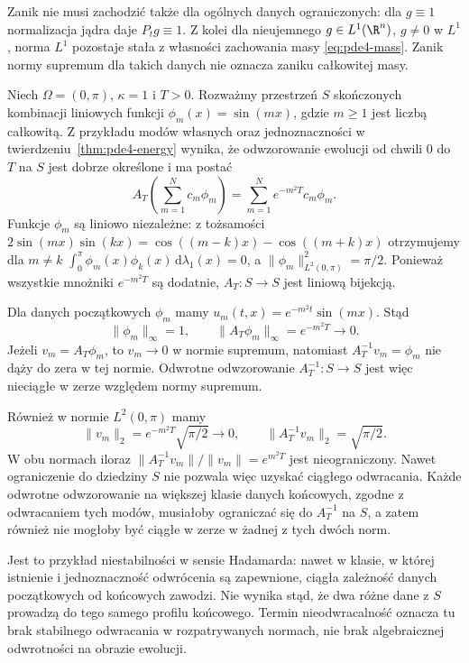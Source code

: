 Zanik nie musi zachodzić także dla ogólnych danych
ograniczonych: dla $g\equiv1$ normalizacja jądra
daje $P_tg\equiv1$. Z kolei dla nieujemnego
$g\in L^1(\R^n)$, $g\not=0$ w $L^1$, norma $L^1$
pozostaje stała z własności zachowania masy
\eqref{eq:pde4-mass}. Zanik normy supremum
dla takich danych nie oznacza zaniku całkowitej masy.

\begin{kontrprzyklad}
\label{ex:pde4-backward}
Niech $\Omega=(0,\pi)$, $\kappa=1$ i $T>0$.
Rozważmy przestrzeń $S$ skończonych kombinacji
liniowych funkcji $\phi_m(x)=\sin(mx)$,
gdzie $m\geq1$ jest liczbą całkowitą.
Z przykładu modów własnych oraz jednoznaczności
w twierdzeniu~\ref{thm:pde4-energy} wynika, że
odwzorowanie ewolucji od chwili $0$ do $T$ na $S$
jest dobrze określone i ma postać
\[
 A_T\left(\sum_{m=1}^N c_m\phi_m\right)
 =\sum_{m=1}^N e^{-m^2T}c_m\phi_m.
\]
Funkcje $\phi_m$ są liniowo niezależne:
z tożsamości
$2\sin(mx)\sin(kx)=\cos((m-k)x)-\cos((m+k)x)$
otrzymujemy dla $m\ne k$
$\int_0^\pi\phi_m(x)\phi_k(x)\,\mathrm d\lambda_1(x)=0$,
a $\|\phi_m\|_{L^2(0,\pi)}^2=\pi/2$.
Ponieważ wszystkie mnożniki $e^{-m^2T}$ są dodatnie,
$A_T:S\to S$ jest liniową bijekcją.

Dla danych początkowych $\phi_m$ mamy
$u_m(t,x)=e^{-m^2t}\sin(mx)$.
Stąd
\[
 \|\phi_m\|_\infty=1,\qquad
 \|A_T\phi_m\|_\infty=e^{-m^2T}\longrightarrow0.
\]
Jeżeli $v_m=A_T\phi_m$, to $v_m\to0$ w normie
supremum, natomiast $A_T^{-1}v_m=\phi_m$
nie dąży do zera w tej normie.
Odwrotne odwzorowanie $A_T^{-1}:S\to S$
jest więc nieciągłe w zerze względem normy supremum.

Również w normie $L^2(0,\pi)$ mamy
\[
 \|v_m\|_2=e^{-m^2T}\sqrt{\pi/2}\longrightarrow0,
 \qquad \|A_T^{-1}v_m\|_2=\sqrt{\pi/2}.
\]
W obu normach iloraz
$\|A_T^{-1}v_m\|/\|v_m\|=e^{m^2T}$ jest
nieograniczony. Nawet ograniczenie do dziedziny $S$
nie pozwala więc uzyskać ciągłego odwracania.
Każde odwrotne odwzorowanie na większej klasie
danych końcowych, zgodne z odwracaniem tych modów,
musiałoby ograniczać się do $A_T^{-1}$ na $S$,
a zatem również nie mogłoby być ciągłe w zerze
w żadnej z tych dwóch norm.

Jest to przykład niestabilności w sensie Hadamarda:
nawet w klasie, w której istnienie i jednoznaczność
odwrócenia są zapewnione, ciągła zależność danych
początkowych od końcowych zawodzi.
Nie wynika stąd, że dwa różne dane z $S$
prowadzą do tego samego profilu końcowego.
Termin nieodwracalność oznacza tu brak stabilnego
odwracania w rozpatrywanych normach, nie brak
algebraicznej odwrotności na obrazie ewolucji.
\end{kontrprzyklad}

